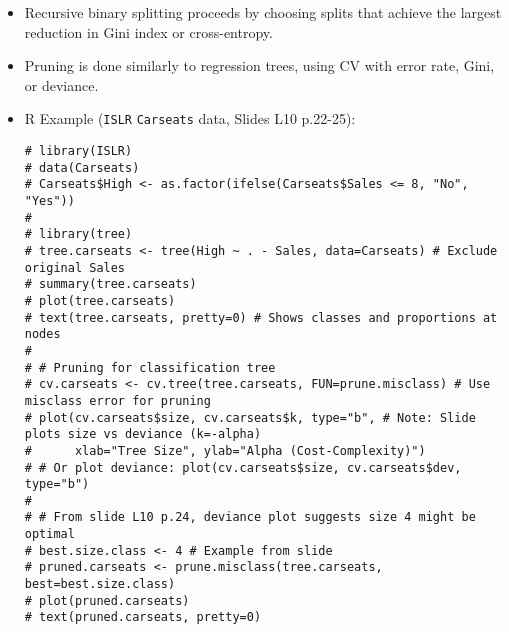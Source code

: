 \documentclass[12pt,a4paper]{article}
\newcommand{\Rpackage}[1]{\texttt{#1}} %
\newcommand{\Robject}[1]{\texttt{#1}} %
\begin{document}
\begin{itemize}
\begin{itemize}
\begin{itemize}
                \end{itemize}
            \item Recursive binary splitting proceeds by choosing splits that achieve the largest reduction in Gini index or cross-entropy.
            \item Pruning is done similarly to regression trees, using CV with error rate, Gini, or deviance.
            \item R Example (\Rpackage{ISLR} \Robject{Carseats} data, Slides L10 p.22-25):
\begin{lstlisting}[caption={Classification Tree for Carseats Data (Slides L10 p.22-25)}]
# library(ISLR)
# data(Carseats)
# Carseats$High <- as.factor(ifelse(Carseats$Sales <= 8, "No", "Yes"))
# 
# library(tree)
# tree.carseats <- tree(High ~ . - Sales, data=Carseats) # Exclude original Sales
# summary(tree.carseats)
# plot(tree.carseats)
# text(tree.carseats, pretty=0) # Shows classes and proportions at nodes
# 
# # Pruning for classification tree
# cv.carseats <- cv.tree(tree.carseats, FUN=prune.misclass) # Use misclass error for pruning
# plot(cv.carseats$size, cv.carseats$k, type="b", # Note: Slide plots size vs deviance (k=-alpha)
#      xlab="Tree Size", ylab="Alpha (Cost-Complexity)") 
# # Or plot deviance: plot(cv.carseats$size, cv.carseats$dev, type="b")
# 
# # From slide L10 p.24, deviance plot suggests size 4 might be optimal
# best.size.class <- 4 # Example from slide
# pruned.carseats <- prune.misclass(tree.carseats, best=best.size.class)
# plot(pruned.carseats)
# text(pruned.carseats, pretty=0)
\end{lstlisting}
        \end{itemize}

\end{itemize}
\end{document}
